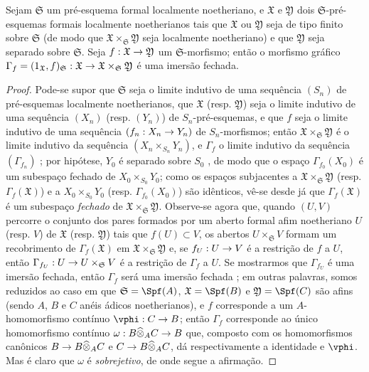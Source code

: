 \documentclass[oneside]{amsart}
\makeatletter
\newcommand{\ega@arrow}[2]{\mathchoice{#1}{#2}{#2}{#2}}
\renewcommand{\to}{\ega@arrow{\longrightarrow}{\rightarrow}}
\let\EGAOriginalLabel\label
\renewcommand{\label}[1]{\phantomsection\EGAOriginalLabel{#1}}
\makeatother
\begin{document}
\begin{proposition}[10.15.4]
\label{I.10.15.4}
Sejam $\mathfrak{S}$ um pré-esquema formal localmente noetheriano, e $\mathfrak{X}$ e $\mathfrak{Y}$ dois $\mathfrak{S}$-pré-esquemas formais localmente noetherianos tais que $\mathfrak{X}$ ou $\mathfrak{Y}$ seja de tipo finito sobre $\mathfrak{S}$ (de modo que $\mathfrak{X}\times_\mathfrak{S}\mathfrak{Y}$ seja localmente noetheriano) e que $\mathfrak{Y}$ seja separado sobre $\mathfrak{S}$.
Seja $f:\mathfrak{X}\to\mathfrak{Y}$ um $\mathfrak{S}$-morfismo; então o morfismo gráfico $\Gamma_f=(1_\mathfrak{X},f)_\mathfrak{S}:\mathfrak{X}\to\mathfrak{X}\times_\mathfrak{S}\mathfrak{Y}$ é uma imersão fechada.
\end{proposition}

\begin{proof}
Pode-se supor que $\mathfrak{S}$ seja o limite indutivo de uma sequência $(S_n)$ de pré-esquemas localmente noetherianos, que $\mathfrak{X}$ (resp. $\mathfrak{Y}$) seja o limite indutivo de uma sequência $(X_n)$ (resp. $(Y_n)$) de $S_n$-pré-esquemas, e que $f$ seja o limite indutivo de uma sequência $(f_n:X_n\to Y_n)$ de $S_n$-morfismos;
então $\mathfrak{X}\times_\mathfrak{S}\mathfrak{Y}$ é o limite indutivo da sequência $(X_n\times_{S_n}Y_n)$, e $\Gamma_f$ o limite indutivo da sequência $(\Gamma_{f_n})$ ;
por hipótese, $Y_0$ é separado sobre $S_0$ , de modo que o espaço $\Gamma_{f_0}(X_0)$ é um subespaço fechado de $X_0\times_{S_0}Y_0$;
como os espaços subjacentes a $\mathfrak{X}\times_\mathfrak{S}\mathfrak{Y}$ (resp. $\Gamma_f(\mathfrak{X})$) e a $X_0\times_{S_0}Y_0$ (resp. $\Gamma_{f_0}(X_0)$) são idênticos, vê-se desde já que $\Gamma_f(\mathfrak{X})$ é um subespaço \emph{fechado} de $\mathfrak{X}\times_\mathfrak{S}\mathfrak{Y}$.
Observe-se agora que, quando $(U,V)$ percorre o conjunto dos pares formados por um aberto formal afim noetheriano $U$ (resp. $V$) de $\mathfrak{X}$ (resp. $\mathfrak{Y}$) tais que $f(U)\subset V$, os abertos $U\times_\mathfrak{S} V$ formam um recobrimento de $\Gamma_f(\mathfrak{X})$ em $\mathfrak{X}\times_\mathfrak{S}\mathfrak{Y}$ e, se $f_U:U\to V$ é a restrição de $f$ a $U$, então $\Gamma_{f_U}:U\to U\times_\mathfrak{S}V$ é a restrição de $\Gamma_f$ a $U$.
Se mostrarmos que $\Gamma_{f_U}$ é uma imersão fechada, então $\Gamma_f$ será uma imersão fechada ; em outras palavras, somos reduzidos ao caso em que $\mathfrak{S}=\Spf(A)$, $\mathfrak{X}=\Spf(B)$ e $\mathfrak{Y}=\Spf(C)$ são afins (sendo $A$, $B$ e $C$ anéis ádicos noetherianos), e $f$ corresponde a um $A$-homomorfismo contínuo $\vphi:C\to B$;
então $\Gamma_f$ corresponde ao único homomorfismo contínuo $\omega: B\widehat{\otimes}_A C\to B$ que, composto com os homomorfismos canônicos $B\to B\widehat{\otimes}_A C$ e $C\to B\widehat{\otimes}_A C$, dá respectivamente a identidade e $\vphi$.
Mas é claro que $\omega$ é \emph{sobrejetivo}, de onde segue a afirmação.
\end{proof}
\end{document}
